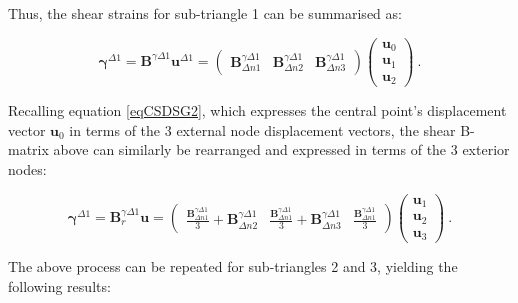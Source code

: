 Thus, the shear strains for sub-triangle 1 can be summarised as:

  \begin{equation} 
\boldsymbol{\gamma}^{\Delta 1} =
\mathbf{B}^{\gamma\Delta 1}
\mathbf{u}^{\Delta 1}
=
\begin{pmatrix}
\mathbf{B}_{\Delta n1}^{\gamma\Delta 1} & \mathbf{B}_{\Delta n2}^{\gamma\Delta 1} & \mathbf{B}_{\Delta n3}^{\gamma\Delta 1}
\end{pmatrix}
\begin{pmatrix}
\mathbf{u}_0 \\
\mathbf{u}_1 \\
\mathbf{u}_2
\end{pmatrix}
\label{eqCSDSG7}\ .
\end{equation}

Recalling equation \ref{eqCSDSG2}, which expresses the central point's displacement vector $\mathbf{u}_0$ in terms of the 3 external node displacement vectors, the shear B-matrix above can similarly be rearranged and expressed in terms of the 3 exterior nodes:

  \begin{equation} 
\boldsymbol{\gamma}^{\Delta 1} =
\mathbf{B}_r^{\gamma\Delta 1}
\mathbf{u}
=
\begin{pmatrix}
\frac{\mathbf{B}_{\Delta n1}^{\gamma\Delta 1}}{3} + \mathbf{B}_{\Delta n2}^{\gamma\Delta 1} & \frac{\mathbf{B}_{\Delta n1}^{\gamma\Delta 1}}{3} + \mathbf{B}_{\Delta n3}^{\gamma\Delta 1} & \frac{\mathbf{B}_{\Delta n1}^{\gamma\Delta 1}}{3}
\end{pmatrix}
\begin{pmatrix}
\mathbf{u}_1 \\
\mathbf{u}_2 \\
\mathbf{u}_3
\end{pmatrix}
\label{eqCSDSG8}\ .
\end{equation}

The above process can be repeated for sub-triangles 2 and 3, yielding the following results:

